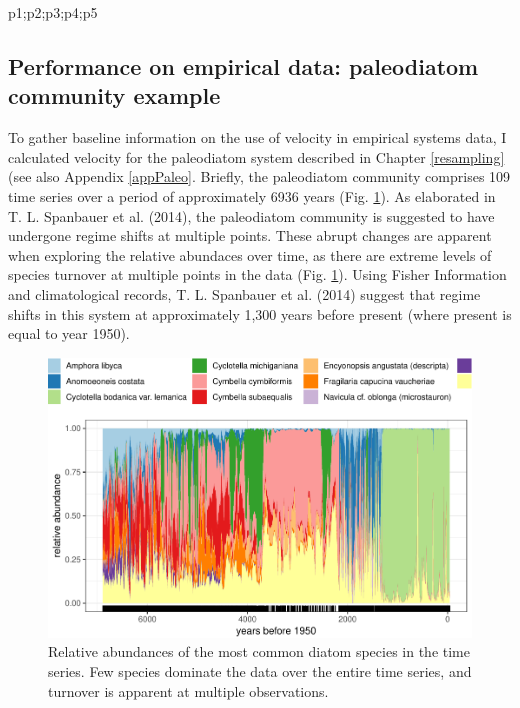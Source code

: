 \documentclass[12pt,twoside,openany]{reedthesis}
\newenvironment{Shaded}{\begin{snugshade}}{\end{snugshade}}
\newcommand{\NormalTok}[1]{#1}
\begin{document}
\begin{Shaded}
\begin{Highlighting}[]
\NormalTok{p1;p2;p3;p4;p5}
\end{Highlighting}
\end{Shaded}
\subsection{Performance on empirical data: paleodiatom community
example}\label{performance-on-empirical-data-paleodiatom-community-example}

To gather baseline information on the use of velocity in empirical
systems data, I calculated velocity for the paleodiatom system described
in Chapter \ref{resampling} (see also Appendix \ref{appPaleo}. Briefly,
the paleodiatom community comprises 109 time series over a period of
approximately 6936 years (Fig. \ref{fig:paleoTurnover}). As elaborated
in T. L. Spanbauer et al. (2014), the paleodiatom community is suggested
to have undergone regime shifts at multiple points. These abrupt changes
are apparent when exploring the relative abundaces over time, as there
are extreme levels of species turnover at multiple points in the data
(Fig. \ref{fig:paleoTurnover}). Using Fisher Information and
climatological records, T. L. Spanbauer et al. (2014) suggest that
regime shifts in this system at approximately 1,300 years before present
(where present is equal to year 1950).
\begin{figure}
\centering
\includegraphics{_myDissertation_files/figure-latex/paleoTurnover-1.pdf}
\caption{\label{fig:paleoTurnover}Relative abundances of the most common
diatom species in the time series. Few species dominate the data over
the entire time series, and turnover is apparent at multiple
observations.}
\end{figure}
\end{document}

